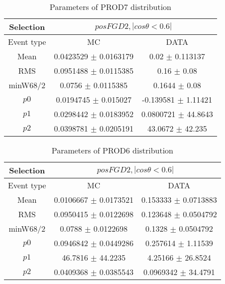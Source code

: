 \documentclass[a4paper,12pt]{article}
\begin{document}
\begin{table}[htbp]
\begin{center}
\begin{tabular}{|c|c|c|}
        \hline
        Selection & \multicolumn{2}{|c|}{$posFGD2, |cos\theta<0.6|$}  \\ \hline
        Event type & MC & DATA \\ 
        \hline
        Mean & 0.0423529 $\pm$ 0.0163179 & 0.02 $\pm$ 0.113137 \\ 
        \hline 
        RMS & 0.0951488 $\pm$ 0.0115385 & 0.16 $\pm$ 0.08 \\ 
        \hline 
        minW68/2 & 0.0756 $\pm$ 0.0115385 & 0.1644 $\pm$ 0.08 \\ 
        \hline 
        $p0$ & 0.0194745 $\pm$ 0.015027 & -0.139581 $\pm$ 1.11421 \\ 
        \hline 
        $p1$ & 0.0298442 $\pm$ 0.0183952 & 0.0800721 $\pm$ 44.8643 \\ 
        \hline 
        $p2$ & 0.0398781 $\pm$ 0.0205191 & 43.0672 $\pm$ 42.235 \\ 
        \hline 
\end{tabular}
\caption{Parameters of PROD7 distribution } \vspace{0.2in}
\label{xxx}
\end{center}
\end{table}
\begin{table}[htbp]
\begin{center}
\begin{tabular}{|c|c|c|}
        \hline
        Selection & \multicolumn{2}{|c|}{$posFGD2, |cos\theta<0.6|$}  \\ \hline
        Event type & MC & DATA \\ 
        \hline
        Mean & 0.0106667 $\pm$ 0.0173521 & 0.153333 $\pm$ 0.0713883 \\ 
        \hline 
        RMS & 0.0950415 $\pm$ 0.0122698 & 0.123648 $\pm$ 0.0504792 \\ 
        \hline 
        minW68/2 & 0.0788 $\pm$ 0.0122698 & 0.1328 $\pm$ 0.0504792 \\ 
        \hline 
        $p0$ & 0.0946842 $\pm$ 0.0449286 & 0.257614 $\pm$ 1.11539 \\ 
        \hline 
        $p1$ & 46.7816 $\pm$ 44.2235 & 4.25166 $\pm$ 26.8524 \\ 
        \hline 
        $p2$ & 0.0409368 $\pm$ 0.0385543 & 0.0969342 $\pm$ 34.4791 \\ 
        \hline 
\end{tabular}
\caption{Parameters of PROD6 distribution } \vspace{0.2in}
\label{xxx}
\end{center}
\end{table}
\end{document}
